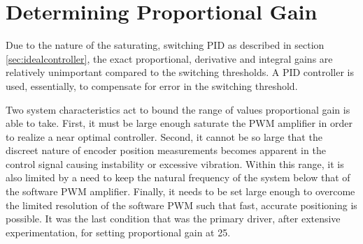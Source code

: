 \section{Determining Proportional Gain}

Due to the nature of the saturating, switching PID as described in section \ref{sec:idealcontroller}, the exact proportional, derivative and integral gains are relatively unimportant compared to the switching thresholds.
A PID controller is used, essentially, to compensate for error in the switching threshold.

Two system characteristics act to bound the range of values proportional gain is able to take.
First, it must be large enough saturate the PWM amplifier in order to realize a near optimal controller.
Second, it cannot be so large that the discreet nature of encoder position measurements becomes apparent in the control signal causing instability or excessive vibration.
Within this range, it is also limited by a need to keep the natural frequency of the system below that of the software PWM amplifier.
Finally, it needs to be set large enough to overcome the limited resolution of the software PWM such that fast, accurate positioning is possible.
It was the last condition that was the primary driver, after extensive experimentation, for setting proportional gain at 25.


